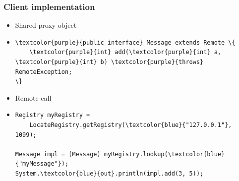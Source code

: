 \documentclass[10pt,xcolor=pdflatex]{beamer}
\begin{document}
\begin{frame}[containsverbatim]\frametitle{Client implementation}
\begin{itemize}
	\item Shared proxy object
  	\item[]  \begin{Verbatim}[fontsize=\footnotesize, commandchars=\\\{\}]
\textcolor{purple}{public interface} Message extends Remote \{
    \textcolor{purple}{int} add(\textcolor{purple}{int} a, \textcolor{purple}{int} b) \textcolor{purple}{throws} RemoteException;
\}    	
\end{Verbatim} 
    \item Remote call
	\item[]  \begin{Verbatim}[fontsize=\footnotesize, commandchars=\\\{\}]
Registry myRegistry = 
    LocateRegistry.getRegistry(\textcolor{blue}{"127.0.0.1"}, 1099);

Message impl = (Message) myRegistry.lookup(\textcolor{blue}{"myMessage"});
System.\textcolor{blue}{out}.println(impl.add(3, 5));
\end{Verbatim}
\end{itemize}
\end{frame}
\end{document}
